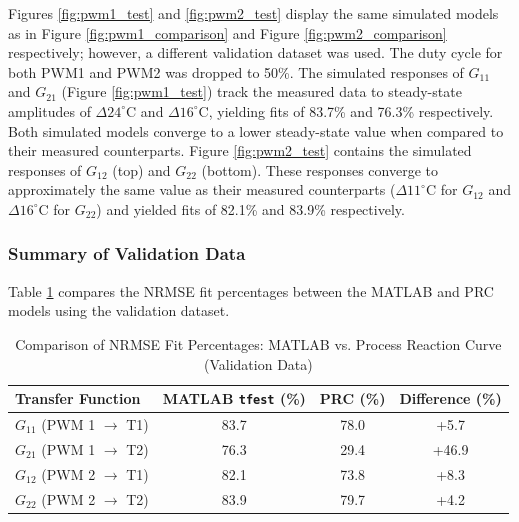 Figures \ref{fig:pwm1_test} and \ref{fig:pwm2_test} display the same simulated models as in Figure \ref{fig:pwm1_comparison} and Figure \ref{fig:pwm2_comparison} respectively; however, a different validation dataset was used.
The duty cycle for both PWM1 and PWM2 was dropped to 50\%. The simulated responses of $G_{11}$ and $G_{21}$ (Figure \ref{fig:pwm1_test}) track the measured data to steady-state amplitudes of $\Delta 24^\circ\text{C}$ and $\Delta 16^\circ\text{C}$, 
yielding fits of 83.7\%  and 76.3\% respectively. Both simulated models converge to a lower steady-state value when compared to their measured counterparts. Figure \ref{fig:pwm2_test} contains the simulated responses of $G_{12}$ (top) and $G_{22}$ (bottom). These responses converge to 
approximately the same value as their measured counterparts ($\Delta 11^\circ\text{C}$ for $G_{12}$ and $\Delta 16^\circ\text{C}$ for $G_{22}$) and yielded fits of 82.1\% and 83.9\% respectively.

\subsubsection{Summary of Validation Data}

Table \ref{tab:nrmse_comparison} compares the NRMSE fit percentages between the MATLAB and PRC models using the validation dataset.

\begin{table}[H]
    \centering
    \renewcommand{\arraystretch}{1.3} %
    \caption{Comparison of NRMSE Fit Percentages: MATLAB vs. Process Reaction Curve (Validation Data)}
    \label{tab:nrmse_comparison}
    \begin{tabular}{lccc}
        \hline
        \textbf{Transfer Function} & \textbf{MATLAB \texttt{tfest} (\%)} & \textbf{PRC (\%)} & \textbf{Difference (\%)} \\
        \hline
        $G_{11}$ (PWM 1 $\rightarrow$ T1) & 83.7 & 78.0 & +5.7 \\
        $G_{21}$ (PWM 1 $\rightarrow$ T2) & 76.3 & 29.4 & +46.9 \\
        $G_{12}$ (PWM 2 $\rightarrow$ T1) & 82.1 & 73.8 & +8.3 \\
        $G_{22}$ (PWM 2 $\rightarrow$ T2) & 83.9 & 79.7 & +4.2 \\
        \hline
    \end{tabular}
\end{table}